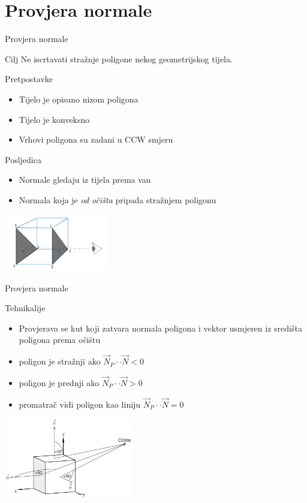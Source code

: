 \documentclass[9pt]{beamer}
\begin{document}
\section{Provjera normale}
\begin{frame}{Provjera normale}
	\begin{block}{Cilj}
		Ne iscrtavati stražnje poligone nekog geometrijskog tijela.
	\end{block}
	\begin{block}{Pretpostavke}
		\begin{itemize}
			\item Tijelo je opisano nizom poligona
			\item Tijelo je konveksno
			\item Vrhovi poligona su zadani u CCW smjeru
		\end{itemize}
	\end{block}
	\begin{block}{Posljedica}
		\begin{itemize}
			\item Normale gledaju iz tijela prema van
			\item Normala koja je \textit{od očišta} pripada stražnjem poligonu
		\end{itemize}
	\end{block}
\begin{center}
	\includegraphics[height=2.5cm]{./slike/faceculling_frontback.png}
\end{center}
\end{frame}
\begin{frame}{Provjera normale}
	\begin{block}{Tehnikalije}
		\begin{itemize}
			\item Provjerava se kut koji zatvara normala poligona i vektor usmjeren iz središta poligona prema očištu
			\item poligon je stražnji ako $\vec{N}_P\cdot \cdot \vec{N} < 0$
			\item poligon je prednji ako $\vec{N}_P\cdot \cdot \vec{N} > 0$
			\item promatrač vidi poligon kao liniju $\vec{N}_P\cdot \cdot \vec{N} = 0$
		\end{itemize}
	\end{block}
	\begin{center}
		\includegraphics[height=3.5cm]{./slike/provjera_normala.png}
	\end{center}
\end{frame}
\end{document}
